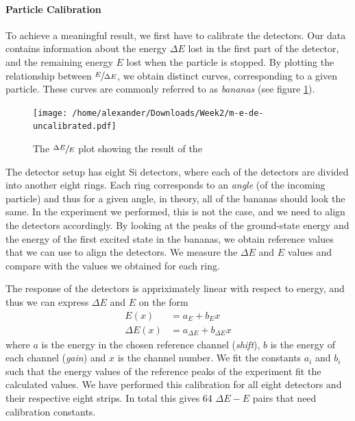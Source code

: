 \documentclass[a4paper,12pt]{article}
\newcommand{\eq}[1]{{\small\begin{align*}#1\end{align*}}}
\begin{document}
\paragraph{Particle Calibration}
To achieve a meaningful result, we first have to calibrate the 
detectors. Our data contains information about the energy
$\Delta E$ lost in the first part of the detector,
and the remaining energy $E$ lost when the particle is stopped.
By plotting the relationship between $\sfrac{E}{\Delta E}$,
we obtain distinct curves, corresponding to a given particle.
These curves are commonly referred to as \textit{bananas}
(see figure \ref{fig:bananas-plain}).

\begin{figure}[H]
    \centering
    \texttt{[image: /home/alexander/Downloads/Week2/m-e-de-uncalibrated.pdf]}
    \caption{The $\sfrac{\Delta E}{E}$ plot showing the result of the }
    \label{fig:bananas-plain}
\end{figure}

The detector setup has eight Si detectors, where each of the detectors
are divided into another eight rings. Each ring corresponds to
an \emph{angle} (of the incoming particle) and thus for a given angle, 
in theory, all of the bananas should look the same.
In the experiment we performed, this is not the case,
and we need to align the detectors accordingly.
By looking at the peaks of the ground-state energy
and the energy of the first excited state in the bananas, we obtain reference
values that we can use to align the detectors.
We measure the $\Delta E$ and $E$ values
and compare with the values we obtained for each ring.

The response of the detectors is appriximately linear
with respect to energy, and thus we can express $\Delta E$ and $E$
on the form
\eq{E(x) &= a_E + b_E x\\
    \Delta E(x) &= a_{\Delta E} + b_{\Delta E} x
}
where $a$ is the energy in the chosen reference channel
(\emph{shift}),
$b$ is the energy of each channel (\emph{gain}) and
$x$ is the channel number. We fit the constants $a_i$ and $b_i$
such that the energy values of the reference peaks of the experiment 
fit the calculated values.
We have performed this calibration for all eight detectors and
their respective eight strips. In total this gives 
64 $\Delta E - E$ pairs that need calibration constants.
\end{document}
